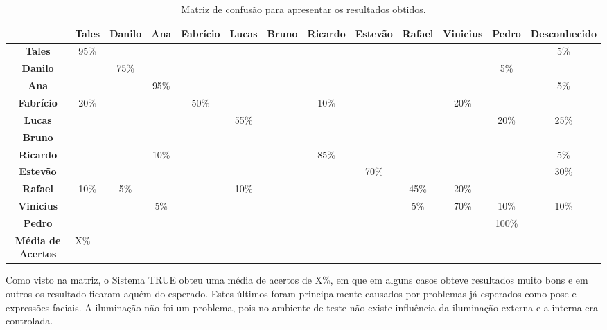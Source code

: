 	\begin{landscape}
	\begin{table}[H]
		\begin{center}
			\caption{Matriz de confusão para apresentar os resultados obtidos.}
			\label{tab:matriz-confusao}
			\begin{tabular}{|c|c|c|c|c|c|c|c|c|c|c|c|c|}
				\hline  & \bf Tales & \bf Danilo & \bf Ana & \bf Fabrício & \bf Lucas & \bf Bruno & \bf Ricardo & \bf Estevão & \bf Rafael & \bf Vinicius & \bf Pedro & \bf Desconhecido\\
				\hline \bf Tales 		& 95\% & 			& 		 & 			& & & 		 & & 		 & 			& 		 & 5\%\\
				\hline \bf Danilo 	& 		 & 75\% & 		 & 			& & & 		 & & 		 & 			& 5\%  &		\\
				\hline \bf Ana 			& 		 & 			& 95\% & 			& & & 		 & & 		 & 			& 		 & 5\%\\
				\hline \bf Fabrício & 20\% & 			& 		 & 50\% & & & 10\% & & 		 & 20\% & 		 &		\\
				\hline \bf Lucas 		& 		 & 			& 		 & 			& 55\% & & 		 & & 		 & 			& 	20\%	 &	25\%	\\
				\hline \bf Bruno 		& 		 & 			& 		 & 			& & & 		 & & 		 & 			& 		 &		\\
				\hline \bf Ricardo 	& 		 & 			& 10\% & 			& & & 85\% & & 		 & 			& 		 & 5\%\\
				\hline \bf Estevão 	& 		 & 			& 		 & 			& & & 		 & 70\% & 		 & 			& 		 & 30\%\\
				\hline \bf Rafael 	& 10\% & 	5\%	& 		 & 			& 10\% & & 		 & & 	45\%	 & 	20\%	& 		 &		\\
				\hline \bf Vinicius & 		 & 			& 5\%  & 			& & & 		 & & 5\% & 70\% & 10\% & 10\%\\
				\hline \bf Pedro 		& 		 & 			& 		 & 			& & & 		 & & 		 & 			& 	100\%	 &		\\
				\hline
				\hline \bf Média de Acertos & \multicolumn{12}{|l|}{X\%} \\
				\hline
			\end{tabular}
		\end{center}
	\end{table}
	\end{landscape}

	Como visto na matriz, o Sistema TRUE obteu uma média de acertos de X\%, em que em alguns casos obteve resultados muito bons e em outros os resultado ficaram aquém do esperado. Estes últimos foram principalmente causados por problemas já esperados como pose e expressões faciais. A iluminação não foi um problema, pois no ambiente de teste não existe influência da iluminação externa e a interna era controlada.
